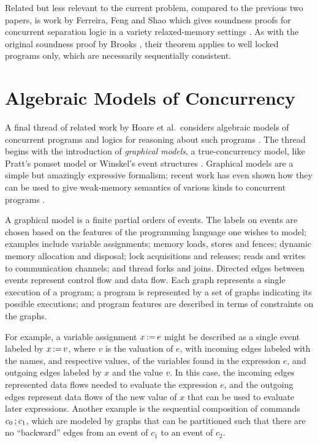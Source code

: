 \documentclass[11pt]{report}         %
\begin{document}
Related but less relevant to the current problem, compared to the previous two papers, is work by Ferreira, Feng and Shao which gives soundness proofs for concurrent separation logic in a variety relaxed-memory settings \cite{DBLP:conf/esop/FerreiraFS10}. As with the original soundness proof by Brooks \cite{DBLP:journals/tcs/Brookes07}, their theorem applies to well locked programs only, which are necessarily sequentially consistent. 

\section{Algebraic Models of Concurrency}
\label{sec:algebraic-models-of-concurrency}

A final thread of related work by Hoare et al.\ considers algebraic models of concurrent programs and logics for reasoning about such programs \cite{DBLP:journals/ipl/WehrmanHO09}. The thread begins with the introduction of \emph{graphical models}, a true-concurrency model, like Pratt's pomset model \cite{DBLP:conf/popl/Pratt82,DBLP:conf/concur/Pratt84} or Winskel's event structures \cite{DBLP:conf/ac/Winskel86}. Graphical models are a simple but amazingly expressive formalism; recent work has even shown how they can be used to give weak-memory semantics of various kinds to concurrent programs \cite{DBLP:series/natosec/HoareW11}. 

A graphical model is a finite partial orders of events. The labels on events are chosen based on the features of the programming language one wishes to model; examples include variable assignments; memory loads, stores and fences; dynamic memory allocation and disposal; lock acquisitions and releases; reads and writes to communication channels; and thread forks and joins. Directed edges between events represent control flow and data flow. Each graph represents a single execution of a program; a program is represented by a set of graphs indicating its possible executions; and program features are described in terms of constraints on the graphs. 

For example, a variable assignment $x \operatorname{:\!=} e$ might be described as a single event labeled by $x \operatorname{:\!=} v$, where $v$ is the valuation of $e$, with incoming edges labeled with the names, and respective values, of the variables found in the expression $e$, and outgoing edges labeled by $x$ and the value $v$. In this case, the incoming edges represented data flows needed to evaluate the expression $e$, and the outgoing edges represent data flows of the new value of $x$ that can be used to evaluate later expressions. Another example is the sequential composition of commands $c_0 \operatorname{;} c_1$, which are modeled by graphs that can be partitioned such that there are no ``backward'' edges from an event of $c_1$ to an event of $c_2$. 
\end{document}
